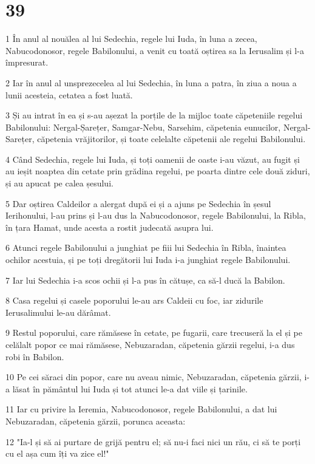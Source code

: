 \chapter{39}

\par 1 În anul al nouălea al lui Sedechia, regele lui Iuda, în luna a zecea, Nabucodonosor, regele Babilonului, a venit cu toată oștirea sa la Ierusalim și l-a împresurat.
\par 2 Iar în anul al unsprezecelea al lui Sedechia, în luna a patra, în ziua a noua a lunii acesteia, cetatea a fost luată.
\par 3 Și au intrat în ea și s-au așezat la porțile de la mijloc toate căpeteniile regelui Babilonului: Nergal-Șarețer, Samgar-Nebu, Sarsehim, căpetenia eunucilor, Nergal-Sarețer, căpetenia vrăjitorilor, și toate celelalte căpetenii ale regelui Babilonului.
\par 4 Când Sedechia, regele lui Iuda, și toți oamenii de oaste i-au văzut, au fugit și au ieșit noaptea din cetate prin grădina regelui, pe poarta dintre cele două ziduri, și au apucat pe calea șesului.
\par 5 Dar oștirea Caldeilor a alergat după ei și a ajuns pe Sedechia în șesul Ierihonului, l-au prins și l-au dus la Nabucodonosor, regele Babilonului, la Ribla, în țara Hamat, unde acesta a rostit judecată asupra lui.
\par 6 Atunci regele Babilonului a junghiat pe fiii lui Sedechia în Ribla, înaintea ochilor acestuia, și pe toți dregătorii lui Iuda i-a junghiat regele Babilonului.
\par 7 Iar lui Sedechia i-a scos ochii și l-a pus în cătușe, ca să-l ducă la Babilon.
\par 8 Casa regelui și casele poporului le-au ars Caldeii cu foc, iar zidurile Ierusalimului le-au dărâmat.
\par 9 Restul poporului, care rămăsese în cetate, pe fugarii, care trecuseră la el și pe celălalt popor ce mai rămăsese, Nebuzaradan, căpetenia gărzii regelui, i-a dus robi în Babilon.
\par 10 Pe cei săraci din popor, care nu aveau nimic, Nebuzaradan, căpetenia gărzii, i-a lăsat în pământul lui Iuda și tot atunci le-a dat viile și țarinile.
\par 11 Iar cu privire la Ieremia, Nabucodonosor, regele Babilonului, a dat lui Nebuzaradan, căpetenia gărzii, porunca aceasta:
\par 12 "Ia-l și să ai purtare de grijă pentru el; să nu-i faci nici un rău, ci să te porți cu el așa cum îți va zice el!"
